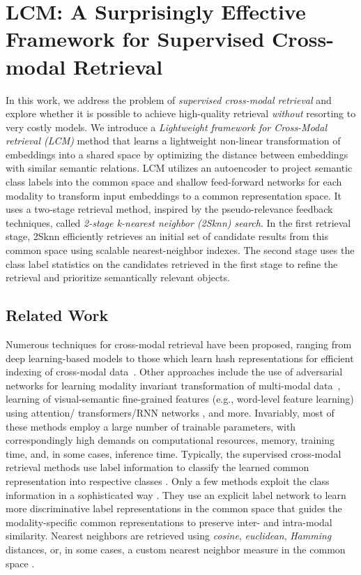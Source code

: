 \section{LCM: A Surprisingly Effective Framework for Supervised Cross-modal Retrieval} \label{sec:lcm}

In this work, we address the problem of \emph{supervised cross-modal retrieval} and explore whether it is possible to achieve high-quality retrieval \emph{without} resorting to very costly models. We introduce a \emph{Lightweight framework for Cross-Modal retrieval (LCM)} method that learns a lightweight non-linear transformation of embeddings into a shared space by optimizing the distance between embeddings with similar semantic relations. LCM utilizes an autoencoder to project semantic class labels into the common space and shallow feed-forward networks for each modality to transform input embeddings to a common representation space. It uses a two-stage retrieval method, inspired by the pseudo-relevance feedback techniques, called \textit{2-stage k-nearest neighbor (2Sknn) search}. In the first retrieval stage, 2Sknn efficiently retrieves an initial set of candidate results from this common space using scalable nearest-neighbor indexes. The second stage uses the class label statistics on the candidates retrieved in the first stage to refine the retrieval and prioritize semantically relevant objects.

\subsection{Related Work}
Numerous techniques for cross-modal retrieval have been proposed, ranging from deep learning-based models to those which learn hash representations for efficient indexing of cross-modal data~\cite{clip4cmr,pan,sdml,acmr,dscmr,dsmhn,dvsh,svhn,prdh,ssah,mmach}. Other approaches include the use of adversarial networks for learning modality invariant transformation of multi-modal data~\cite{acmr, daml, ssah}, learning of visual-semantic fine-grained features (e.g., word-level feature learning) using attention/ transformers/RNN networks \cite{Lee2018StackedCA, Chen2020IMRAMIM, Qu2021DynamicMI, Cao2021GlobalRA}, and more. 
Invariably, most of these methods employ a large number of trainable parameters, with correspondingly high demands on computational resources, memory, training time, and, in some cases, inference time.
Typically, the supervised cross-modal retrieval methods use label information to classify the learned common representation into respective classes \cite{dch, daml, sdml, acmr, dscmr}. Only a few methods exploit the class information in a sophisticated way \cite{svhn, ssah}.
They use an explicit label network to learn more discriminative label representations in the common space that guides the modality-specific common representations to preserve inter- and intra-modal similarity. Nearest neighbors are retrieved using \textit{cosine}, \textit{euclidean}, \textit{Hamming} distances, or, in some cases, a custom nearest neighbor measure in the common space \cite{jgrhml, JRL, cdpae}.

